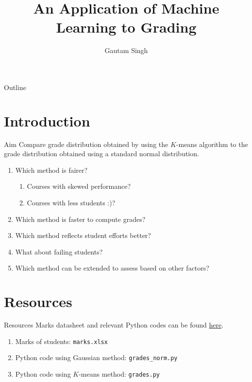 \documentclass{beamer}
\title[Machine Learning in Grading]{An Application of Machine Learning to Grading}
\author{Gautam Singh}
\theoremstyle{remark}
\begin{document}
\begin{frame}
    \titlepage 
\end{frame}

\logo{}

\begin{frame}{Outline}
    \tableofcontents
\end{frame}


\section{Introduction}
\begin{frame}{Aim}
    Compare grade distribution obtained by using the $K$-means algorithm to 
    the grade distribution obtained using a standard normal distribution.
    \begin{enumerate}
        \item Which method is fairer?
        \begin{enumerate}
            \item Courses with skewed performance?
            \item Courses with less students :)?
        \end{enumerate}
        \item Which method is faster to compute grades?
        \item Which method reflects student efforts better?
        \item What about failing students?
        \item Which method can be extended to assess based on other factors?
    \end{enumerate}
\end{frame}

\section{Resources}
\begin{frame}{Resources}
Marks datasheet and relevant Python codes can be found 
\href{https://github.com/goats-9/ee2802-assignments/tree/main/grading/codes}{here}.
\begin{enumerate}
    \item Marks of students: \texttt{marks.xlsx}
    \item Python code using Gaussian method: \texttt{grades\_norm.py}
    \item Python code using $K$-means method: \texttt{grades.py}
\end{enumerate}
\end{frame}
\end{document}
